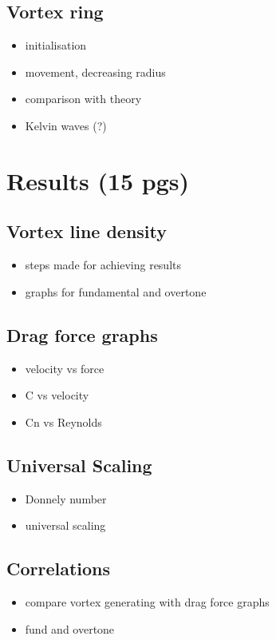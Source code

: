 \documentclass[a4paper, 12pt]{report}
\newcommand{\<}{\langle} %
\renewcommand{\>}{\rangle} %
\begin{document}
\section{Vortex ring}
\begin{itemize}
	\item initialisation
	\item movement, decreasing radius
	\item comparison with theory
	\item Kelvin waves (?)
\end{itemize}

\newpage

\chapter{Results (15 pgs)}

\section{Vortex line density}
\begin{itemize}
	\item steps made for achieving results
	\item graphs for fundamental and overtone
\end{itemize}

\section{Drag force graphs}
\begin{itemize}
	\item velocity vs force
	\item C vs velocity
	\item Cn vs Reynolds
\end{itemize}

\section{Universal Scaling}
\begin{itemize}
	\item Donnely number
	\item universal scaling
\end{itemize}

\section{Correlations}
\begin{itemize}
	\item compare vortex generating with drag force graphs
	\item fund and overtone
\end{itemize}
\end{document}
